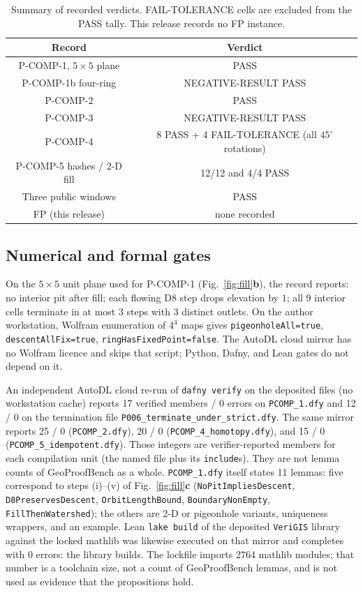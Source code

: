 \documentclass[11pt,a4paper]{article}
\newcommand{\thead}[1]{\multicolumn{1}{c}{#1}}
\begin{document}
\begin{table}[!htbp]
\centering
\caption{Summary of recorded verdicts. FAIL-TOLERANCE cells are excluded
from the PASS tally. This release records no FP instance.}
\label{tab:verdicts}
\begin{tabular}{cc}
\toprule
\thead{Record} & \thead{Verdict} \\
\midrule
P-COMP-1, $5\times5$ plane & PASS \\
P-COMP-1b four-ring & NEGATIVE-RESULT PASS \\
P-COMP-2 & PASS \\
P-COMP-3 & NEGATIVE-RESULT PASS \\
P-COMP-4 & 8 PASS + 4 FAIL-TOLERANCE (all $45^{\circ}$ rotations) \\
P-COMP-5 hashes / 2-D fill & 12/12 and 4/4 PASS \\
Three public windows & PASS \\
FP (this release) & none recorded \\
\bottomrule
\end{tabular}
\end{table}

\subsection{Numerical and formal gates}

On the $5\times5$ unit plane used for P-COMP-1 (Fig.~\ref*{fig:fill}\textbf{b}),
the record reports: no interior pit after fill; each flowing D8 step
drops elevation by $1$; all 9 interior cells terminate in at most 3
steps with 3 distinct outlets. On the author workstation, Wolfram enumeration of $4^{4}$ maps gives
\texttt{pigeonholeAll=true}, \texttt{descentAllFix=true},
\texttt{ringHasFixedPoint=false}. The AutoDL cloud mirror has no Wolfram
licence and skips that script; Python, Dafny, and Lean gates do not
depend on it.

An independent AutoDL cloud re-run of \texttt{dafny verify} on the
deposited files (no workstation cache) reports 17 verified members / 0
errors on \texttt{PCOMP\_1.dfy} and 12 / 0 on the termination file
\texttt{P006\_terminate\_under\_strict.dfy}. The same mirror reports
25 / 0 (\texttt{PCOMP\_2.dfy}), 20 / 0
(\texttt{PCOMP\_4\_homotopy.dfy}), and 15 / 0
(\texttt{PCOMP\_5\_idempotent.dfy}). Those integers are
verifier-reported members for each compilation unit (the named file plus
its \texttt{include}s). They are not lemma counts of GeoProofBench as a
whole. \texttt{PCOMP\_1.dfy} itself states 11 lemmas: five correspond to
steps (i)--(v) of Fig.~\ref*{fig:fill}\textbf{c}
(\texttt{NoPitImpliesDescent}, \texttt{D8PreservesDescent},
\texttt{OrbitLengthBound}, \texttt{BoundaryNonEmpty},
\texttt{FillThenWatershed}); the others are 2-D or pigeonhole variants,
uniqueness wrappers, and an example. Lean \texttt{lake build} of the
deposited \texttt{VeriGIS} library
against the locked mathlib was likewise executed on that mirror and
completes with 0 errors: the library builds. The lockfile imports 2764
mathlib modules; that number is a toolchain size, not a count of
GeoProofBench lemmas, and is not used as evidence that the propositions
hold.
\end{document}
